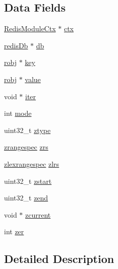 \subsection*{Data Fields}
\begin{DoxyCompactItemize}
\item 
\hyperlink{struct_redis_module_ctx}{Redis\+Module\+Ctx} $\ast$ \hyperlink{struct_redis_module_key_a221ba73ece36a4c95c593459c3fc1d8d}{ctx}
\item 
\hyperlink{structredis_db}{redis\+Db} $\ast$ \hyperlink{struct_redis_module_key_a9bee04e09635a42fef289e42a89f5502}{db}
\item 
\hyperlink{server_8h_a540f174d2685422fbd7d12e3cd44c8e2}{robj} $\ast$ \hyperlink{struct_redis_module_key_adc0ee0ed345db513fb6fac27511be4f1}{key}
\item 
\hyperlink{server_8h_a540f174d2685422fbd7d12e3cd44c8e2}{robj} $\ast$ \hyperlink{struct_redis_module_key_ae0737a2b5e82b2dfbea9c054a8d08e48}{value}
\item 
void $\ast$ \hyperlink{struct_redis_module_key_a90bd46e0b31168ef41c9aa5051a7b4ce}{iter}
\item 
int \hyperlink{struct_redis_module_key_a1ea5d0cb93f22f7d0fdf804bd68c3326}{mode}
\item 
uint32\+\_\+t \hyperlink{struct_redis_module_key_a7f0f33d3cd7a75ecb32808d59da191a5}{ztype}
\item 
\hyperlink{structzrangespec}{zrangespec} \hyperlink{struct_redis_module_key_ab6cf05a3adfdba8d0b5af2db3f72def3}{zrs}
\item 
\hyperlink{structzlexrangespec}{zlexrangespec} \hyperlink{struct_redis_module_key_a3f633fdec59a955cfba03ea0bbc2c2e1}{zlrs}
\item 
uint32\+\_\+t \hyperlink{struct_redis_module_key_a10dca55c0cc253103a7af4717727f384}{zstart}
\item 
uint32\+\_\+t \hyperlink{struct_redis_module_key_a467df6d3265de354629e17fa23d60aec}{zend}
\item 
void $\ast$ \hyperlink{struct_redis_module_key_aa3fb69c6152d197b29c253136e6b989f}{zcurrent}
\item 
int \hyperlink{struct_redis_module_key_a3f8ab02b0506741f78a775123c517a1b}{zer}
\end{DoxyCompactItemize}


\subsection{Detailed Description}


